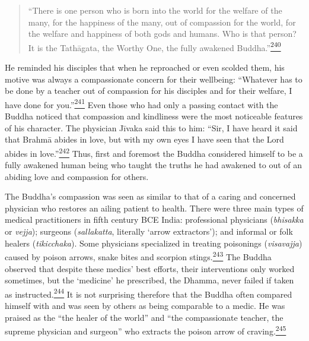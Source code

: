 \begin{quote}
``There is one person who is born into the world for the welfare of the
many, for the happiness of the many, out of compassion for the world,
for the welfare and happiness of both gods and humans. Who is that
person? It is the Tathāgata, the Worthy One, the fully awakened
Buddha.''\label{footprints_split_010.html_fnref240}\hyperref[footprints_split_024.htmlux5cux23fn240]{\textsuperscript{240}}
\end{quote}

He reminded his disciples that when he reproached or even scolded them,
his motive was always a compassionate concern for their wellbeing:
``Whatever has to be done by a teacher out of compassion for his
disciples and for their welfare, I have done for
you.''\label{footprints_split_010.html_fnref241}\hyperref[footprints_split_024.htmlux5cux23fn241]{\textsuperscript{241}}
Even those who had only a passing contact with the Buddha noticed that
compassion and kindliness were the most noticeable features of his
character. The physician Jīvaka said this to him: ``Sir, I have heard it
said that Brahmā abides in love, but with my own eyes I have seen that
the Lord abides in
love.''\label{footprints_split_010.html_fnref242}\hyperref[footprints_split_024.htmlux5cux23fn242]{\textsuperscript{242}}
Thus, first and foremost the Buddha considered himself to be a fully
awakened human being who taught the truths he had awakened to out of an
abiding love and compassion for others.

The Buddha's compassion was seen as similar to that of a caring and
concerned physician who restores an ailing patient to health. There were
three main types of medical practitioners in fifth century BCE India:
professional physicians (\emph{bhisakka} or \emph{vejja}); surgeons
(\emph{sallakatta}, literally `arrow extractors'); and informal or folk
healers (\emph{tikicchaka}). Some physicians specialized in treating
poisonings (\emph{visavajja}) caused by poison arrows, snake bites and
scorpion
stings.\label{footprints_split_010.html_fnref243}\hyperref[footprints_split_024.htmlux5cux23fn243]{\textsuperscript{243}}
The Buddha observed that despite these medics' best efforts, their
interventions only worked sometimes, but the `medicine' he prescribed,
the Dhamma, never failed if taken as
instructed.\label{footprints_split_010.html_fnref244}\hyperref[footprints_split_024.htmlux5cux23fn244]{\textsuperscript{244}}
It is not surprising therefore that the Buddha often compared himself
with and was seen by others as being comparable to a medic. He was
praised as the ``the healer of the world'' and ``the compassionate
teacher, the supreme physician and surgeon'' who extracts the poison
arrow of
craving.\label{footprints_split_010.html_fnref245}\hyperref[footprints_split_024.htmlux5cux23fn245]{\textsuperscript{245}}

